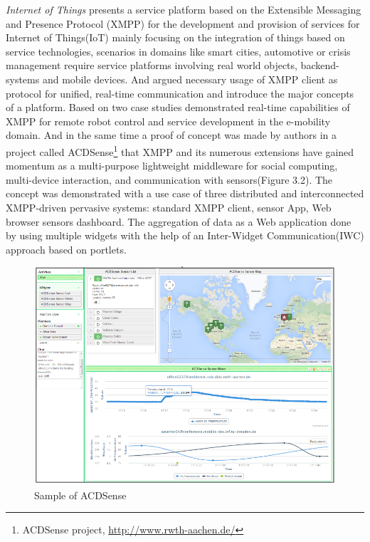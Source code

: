 	\emph{Internet of Things}\cite{bendel2013service} presents a service platform based on the Extensible Messaging and Presence Protocol (XMPP) for the development and provision of services for Internet of Things(IoT) mainly focusing on the integration of things based on service technologies, scenarios in domains like smart cities, automotive or crisis management require service platforms involving real world objects, backend-systems and mobile devices. And argued necessary usage of XMPP client as protocol for unified, real-time communication and introduce the major concepts of a platform. Based on two case studies demonstrated real-time capabilities of XMPP for remote robot control and service development in the e-mobility domain. And in the same time a proof of concept was made by authors in a project called ACDSense\footnote{ACDSense project, \url{http://www.rwth-aachen.de/}} that XMPP and its numerous extensions have gained momentum as a multi-purpose lightweight middleware for social computing, multi-device interaction, and communication with sensors(Figure 3.2). The concept was demonstrated with a use case of three distributed and interconnected XMPP-driven pervasive systems: standard XMPP client, sensor App, Web browser sensors dashboard. The aggregation of data as a Web application done by using multiple widgets with the help of an Inter-Widget Communication(IWC) approach based on portlets\cite{ACDSense}.
	    \begin{figure}[!ht]
		\centering
		\includegraphics[scale=0.6]{Material/examples/ACDSense.png}   
		\caption[Sample of ACDSense]{Sample of ACDSense}                  
		\end{figure} 


